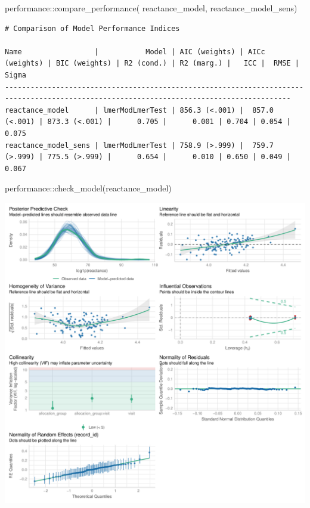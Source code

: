 \documentclass[
  12pt,
]{article}
\newenvironment{Shaded}{\begin{snugshade}}{\end{snugshade}}
\newcommand{\FunctionTok}[1]{\textcolor[rgb]{0.28,0.35,0.67}{#1}}
\newcommand{\NormalTok}[1]{\textcolor[rgb]{0.00,0.23,0.31}{#1}}
\newcommand{\SpecialCharTok}[1]{\textcolor[rgb]{0.37,0.37,0.37}{#1}}
\begin{document}
\begin{Shaded}
\begin{Highlighting}[]
\NormalTok{performance}\SpecialCharTok{::}\FunctionTok{compare\_performance}\NormalTok{(}
\NormalTok{    reactance\_model, }
\NormalTok{    reactance\_model\_sens)}
\end{Highlighting}
\end{Shaded}

\begin{verbatim}
# Comparison of Model Performance Indices

Name                 |           Model | AIC (weights) | AICc (weights) | BIC (weights) | R2 (cond.) | R2 (marg.) |   ICC |  RMSE | Sigma
-----------------------------------------------------------------------------------------------------------------------------------------
reactance_model      | lmerModLmerTest | 856.3 (<.001) |  857.0 (<.001) | 873.3 (<.001) |      0.705 |      0.001 | 0.704 | 0.054 | 0.075
reactance_model_sens | lmerModLmerTest | 758.9 (>.999) |  759.7 (>.999) | 775.5 (>.999) |      0.654 |      0.010 | 0.650 | 0.049 | 0.067
\end{verbatim}

\begin{Shaded}
\begin{Highlighting}[]
\NormalTok{performance}\SpecialCharTok{::}\FunctionTok{check\_model}\NormalTok{(reactance\_model)}
\end{Highlighting}
\end{Shaded}

\includegraphics{Outcomes_files/figure-pdf/reactance_4-1.pdf}
\end{document}

